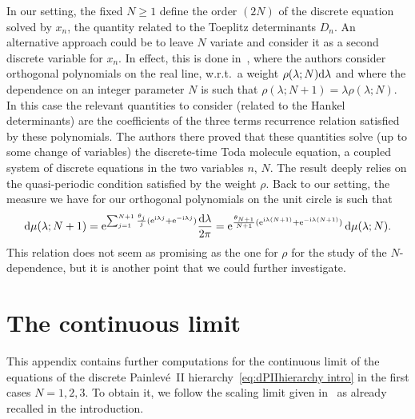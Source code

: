 \documentclass[pdftex]{sigma}%
\numberwithin{equation}{section}
\def\e{\mathrm{e}}
\def\d{\mathrm{d}}
\begin{document}
	\begin{Remark}
		In our setting, the fixed $N\geq 1$ define the order $(2N)$ of the discrete equation solved by $x_n$, the quantity related to the Toeplitz determinants $D_n$. An alternative approach could be to leave $N$ variate and consider it as a second discrete variable for $x_n$. In effect, this is done in~\cite{HisakadoWadatireal}, where the authors consider orthogonal polynomials on the real line, w.r.t.\ a weight $\rho(\lambda;N){\rm d}\lambda$ and where the dependence on an integer parameter $N$ is such that $\rho(\lambda;N+1)=\lambda \rho(\lambda;N)$. In this case the relevant quantities to consider (related to the Hankel determinants) are the coefficients of the three terms recurrence relation satisfied by these polynomials. The authors there proved that these quantities solve (up to some change of variables) the discrete-time Toda molecule equation, a coupled system of discrete equations in the two variables $n$, $N$. The result deeply relies on the quasi-periodic condition satisfied by the weight $\rho$. Back to our setting, the measure we have for our orthogonal polynomials on the unit circle is such that
\[
\d \mu(\lambda;N+1)= \e^{\sum_{j=1}^{N+1} \frac{\theta_j}{j}(\e^{{\rm i} \lambda j}+\e^{-{\rm i} \lambda j})}\frac{\d \lambda}{2\pi}= \e^{\frac{\theta_{N+1}}{N+1}(\e^{{\rm i}\lambda (N+1)}+\e^{-{\rm i}\lambda (N+1)})}\, \d \mu(\lambda;N).
\]
		This relation does not seem as promising as the one for $\rho$ for the study of the $N$-dependence, but it is another point that we could further investigate.
\end{Remark}

\appendix
\section{The continuous limit}
\label{appendix}
This appendix contains further computations for the continuous limit of the equations of the discrete Painlev\'e~II hierarchy~\eqref{eq:dPIIhierarchy intro} in the first cases $N=1,2,3$. To obtain it, we follow the scaling limit given in~\cite[Theorem 1]{betea2021multicritical} as already recalled in the introduction.
\end{document}
